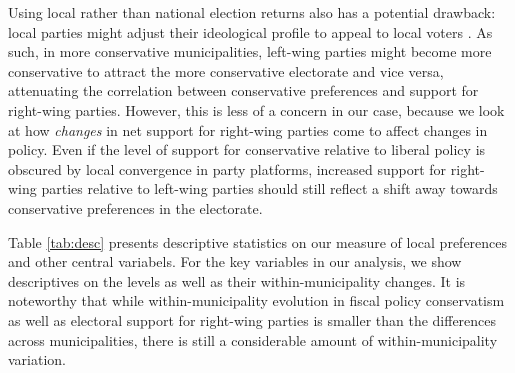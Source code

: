 \documentclass[a4paper,12pt]{article}
\begin{document}
Using local rather than national election returns also has a potential drawback: local parties might adjust their ideological profile to appeal to local voters \citep{erikson1993statehouse}. As such, in more conservative municipalities, left-wing parties might become more conservative to attract the more conservative electorate and vice versa, attenuating the correlation between conservative preferences and support for right-wing parties. However, this is less of a concern in our case, because we look at how \textit{changes} in net support for right-wing parties come to affect changes in policy. Even if the level of support for conservative relative to liberal policy is obscured by local convergence in party platforms, increased support for right-wing parties relative to left-wing parties should still reflect a shift away towards conservative preferences in the electorate.

Table \ref{tab:desc} presents descriptive statistics on our measure of local preferences and other central variabels. For the key variables in our analysis, we show descriptives on the levels as well as their within-municipality changes. It is noteworthy that while within-municipality evolution in fiscal policy conservatism as well as electoral support for right-wing parties is smaller than the differences across municipalities, there is still a considerable amount of within-municipality variation. 
\end{document}
